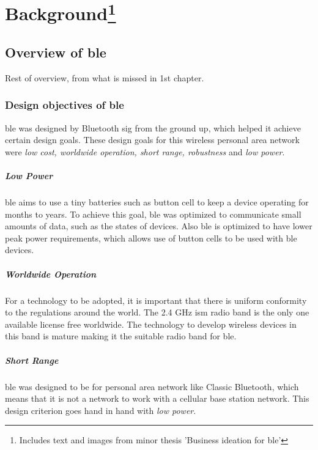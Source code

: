 \chapter[Background]{Background\footnote{Includes text and images from minor thesis 'Business ideation for \gls{ble}'}}

\section{Overview of \acrlong{ble}}
Rest of overview, from what is missed in 1st chapter.

\subsection{Design objectives of \gls{ble}}
\gls{ble} was designed by Bluetooth \gls{sig} from the ground up, which helped it achieve certain design goals. These design goals for this wireless personal area network were \emph{low cost, worldwide operation, short range, robustness} and \emph{low power}\cite{Heydon2012}. 
\paragraph{Low Power} \gls{ble} aims to use a tiny batteries such as button cell to keep a device operating for months to years. To achieve this goal, \gls{ble} was optimized to communicate small amounts of data, such as the states of devices. Also \gls{ble} is optimized to have lower peak power requirements, which allows use of button cells to be used with \gls{ble} devices.
\paragraph{Worldwide Operation}
For a technology to be adopted, it is important that there is uniform conformity to the regulations around the world. The 2.4 \si{\GHz} \gls{ism} radio band is the only one available license free worldwide. The technology to develop wireless devices in this band is mature making it the suitable radio band for \gls{ble}.
\paragraph{Short Range}
\gls{ble} was designed to be for personal area network like Classic Bluetooth, which means that it is not a network to work with a cellular base station network. This design criterion goes hand in hand with \emph{low power}.

